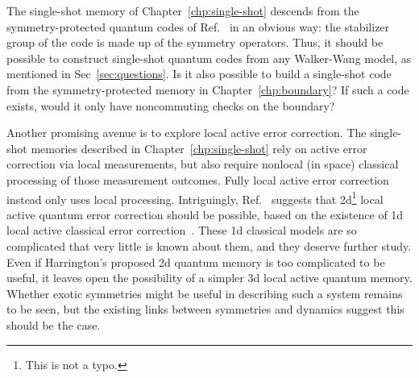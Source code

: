 The single-shot memory of Chapter~\ref{chp:single-shot} descends from the symmetry-protected quantum codes of Ref.~\cite{RobertsBartlett2020} in an obvious way: the stabilizer group of the code is made up of the symmetry operators. Thus, it should be possible to construct single-shot quantum codes from any Walker-Wang model, as mentioned in Sec~\ref{sec:questions}. Is it also possible to build a single-shot code from the symmetry-protected memory in Chapter~\ref{chp:boundary}? If such a code exists, would it only have noncommuting checks on the boundary?

Another promising avenue is to explore local active error correction. The single-shot memories described in Chapter~\ref{chp:single-shot} rely on active error correction via local measurements, but also require nonlocal (in space) classical processing of those measurement outcomes. Fully local active error correction instead only uses local processing. Intriguingly, Ref.~\cite{Harrington2004Thesis} suggests that 2d\footnote{This is not a typo.} local active quantum error correction should be possible, based on the existence of 1d local active classical error correction~\cite{Gacs1983Reliable, Gacs2001Reliable, Gray2001Readers}. These 1d classical models are so complicated that very little is known about them, and they deserve further study. Even if Harrington's proposed 2d quantum memory is too complicated to be useful, it leaves open the possibility of a simpler 3d local active quantum memory. Whether exotic symmetries might be useful in describing such a system remains to be seen, but the existing links between symmetries and dynamics suggest this should be the case.